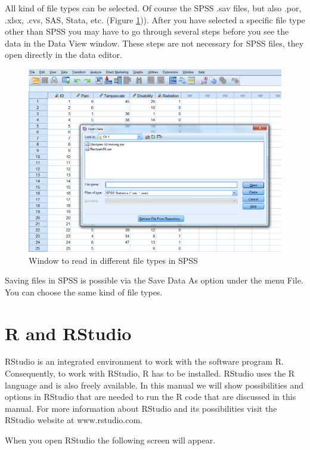 \documentclass[]{book}
\begin{document}
All kind of file types can be selected. Of course the SPSS .sav files,
but also .por, .xlsx, .cvs, SAS, Stata, etc. (Figure \ref{fig:fig8})).
After you have selected a specific file type other than SPSS you may
have to go through several steps before you see the data in the Data
View window. These steps are not necessary for SPSS files, they open
directly in the data editor.

\begin{figure}

{\centering \includegraphics[width=0.95\linewidth]{images/fig1.8} 

}

\caption{Window to read in different file types in SPSS}\label{fig:fig8}
\end{figure}

Saving files in SPSS is possible via the Save Data As option under the
menu File. You can choose the same kind of file types.

\section{R and RStudio}\label{r-and-rstudio}

RStudio is an integrated environment to work with the software program
R. Consequently, to work with RStudio, R has to be installed. RStudio
uses the R language and is also freely available. In this manual we will
show possibilities and options in RStudio that are needed to run the R
code that are discussed in this manual. For more information about
RStudio and its possibilities visit the RStudio website at
www.rstudio.com.

When you open RStudio the following screen will appear.
\end{document}
